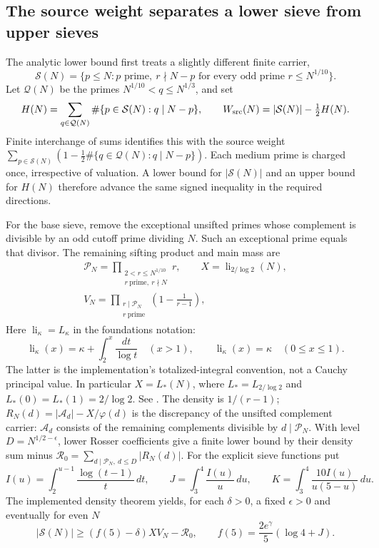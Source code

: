 \subsection{The source weight separates a lower sieve from upper sieves}
The analytic lower bound first treats a slightly different finite carrier,
\[
 \mathcal S(N)=\{p\le N:p\text{ prime},\
    r\nmid N-p\text{ for every odd prime }r\le N^{1/10}\}.
\]
Let $\mathcal Q(N)$ be the primes $N^{1/10}<q\le N^{1/3}$, and set
\[
 H(N)=\sum_{q\in\mathcal Q(N)}\#\{p\in\mathcal S(N):q\mid N-p\},
 \qquad W_{\rm src}(N)=|\mathcal S(N)|-\tfrac12 H(N).
\]
Finite interchange of sums identifies this with the source weight
$\sum_{p\in\mathcal S(N)}(1-\frac12\#\{q\in\mathcal Q(N):q\mid N-p\})$.
Each medium prime is charged once, irrespective of valuation.  A lower bound for $|\mathcal S(N)|$ and an upper bound for $H(N)$ therefore
advance the same signed inequality in the required directions.

For the base sieve, remove the exceptional unsifted primes whose complement
is divisible by an odd cutoff prime dividing $N$.  Such an exceptional
prime equals that divisor.  The remaining sifting product and main mass are
\[\begin{gathered}
 \mathcal P_N=\prod_{\substack{2<r\le N^{1/10}\\r\ \text{prime},\ r\nmid N}}r,
 \qquad X=\operatorname{li}_{2/\log2}(N),\\
 V_N=\prod_{\substack{r\mid\mathcal P_N\\r\ \text{prime}}}\left(1-\frac1{r-1}\right),
\end{gathered}\]
Here $\operatorname{li}_{\kappa}=L_{\kappa}$ in the foundations notation:
\[
 \operatorname{li}_{\kappa}(x)=\kappa+\int_2^x\frac{dt}{\log t}\quad(x>1),
 \qquad \operatorname{li}_{\kappa}(x)=\kappa\quad(0\le x\le1).
\]
The latter is the implementation's totalized-integral convention, not a
Cauchy principal value. In particular $X=L_*(N)$, where
$L_*=L_{2/\log2}$ and $L_*(0)=L_*(1)=2/\log2$.
See .
The density is $1/(r-1)$; $R_N(d)=|\mathcal A_d|-X/\varphi(d)$ is the discrepancy of the unsifted complement
carrier: $\mathcal A_d$ consists of the remaining complements divisible by $d\mid\mathcal P_N$.
With level $D=N^{1/2-\epsilon}$, lower Rosser coefficients give a finite
lower bound by their density sum minus
$\mathcal R_0=\sum_{d\mid\mathcal P_N,\ d\le D}|R_N(d)|$.
For the explicit sieve functions put
\[
 I(u)=\int_2^{u-1}\frac{\log(t-1)}t\,dt,\qquad
 J=\int_3^4\frac{I(u)}u\,du,\qquad
 K=\int_3^4\frac{10I(u)}{u(5-u)}\,du.
\]
The implemented density theorem yields, for each $\delta>0$, a fixed
$\epsilon>0$ and eventually for even $N$
\[
 |\mathcal S(N)|\ge (f(5)-\delta)XV_N-\mathcal R_0,
 \qquad f(5)=\frac{2e^\gamma}{5}(\log4+J).
\]

